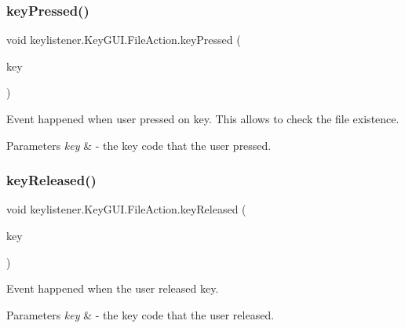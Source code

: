 \subsubsection{\texorpdfstring{key\+Pressed()}{keyPressed()}}
{\footnotesize\ttfamily void keylistener.\+Key\+G\+U\+I.\+File\+Action.\+key\+Pressed (\begin{DoxyParamCaption}\item[{Key\+Event}]{key }\end{DoxyParamCaption})\hspace{0.3cm}{\ttfamily [inline]}}

Event happened when user pressed on key. This allows to check the file existence. 
\begin{DoxyParams}{Parameters}
{\em key} & -\/ the key code that the user pressed. \\
\hline
\end{DoxyParams}
\mbox{\label{classkeylistener_1_1_key_g_u_i_1_1_file_action_a6e55f00ff53af6877115fb94765d64e4}} 
\subsubsection{\texorpdfstring{key\+Released()}{keyReleased()}}
{\footnotesize\ttfamily void keylistener.\+Key\+G\+U\+I.\+File\+Action.\+key\+Released (\begin{DoxyParamCaption}\item[{Key\+Event}]{key }\end{DoxyParamCaption})\hspace{0.3cm}{\ttfamily [inline]}}

Event happened when the user released key. 
\begin{DoxyParams}{Parameters}
{\em key} & -\/ the key code that the user released. \\
\hline
\end{DoxyParams}
\mbox{\label{classkeylistener_1_1_key_g_u_i_1_1_file_action_a5cb1793448cd9291933750efd413d1ec}} 
